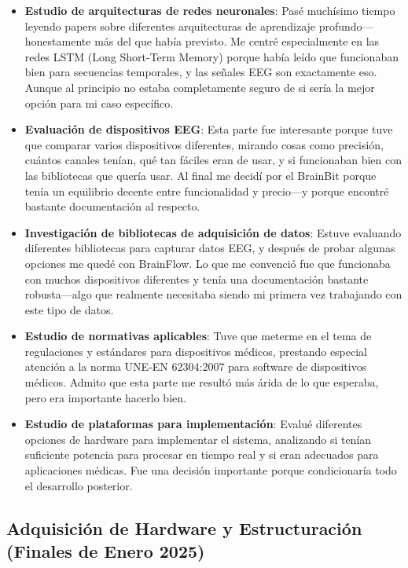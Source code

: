 \begin{itemize}
    \item \textbf{Estudio de arquitecturas de redes neuronales}: Pasé muchísimo tiempo leyendo papers sobre diferentes arquitecturas de aprendizaje profundo—honestamente más del que había previsto. Me centré especialmente en las redes LSTM (Long Short-Term Memory) porque había leído que funcionaban bien para secuencias temporales, y las señales EEG son exactamente eso. Aunque al principio no estaba completamente seguro de si sería la mejor opción para mi caso específico.
    
    \item \textbf{Evaluación de dispositivos EEG}: Esta parte fue interesante porque tuve que comparar varios dispositivos diferentes, mirando cosas como precisión, cuántos canales tenían, qué tan fáciles eran de usar, y si funcionaban bien con las bibliotecas que quería usar. Al final me decidí por el BrainBit porque tenía un equilibrio decente entre funcionalidad y precio—y porque encontré bastante documentación al respecto.
    
    \item \textbf{Investigación de bibliotecas de adquisición de datos}: Estuve evaluando diferentes bibliotecas para capturar datos EEG, y después de probar algunas opciones me quedé con BrainFlow. Lo que me convenció fue que funcionaba con muchos dispositivos diferentes y tenía una documentación bastante robusta—algo que realmente necesitaba siendo mi primera vez trabajando con este tipo de datos.
    
    \item \textbf{Estudio de normativas aplicables}: Tuve que meterme en el tema de regulaciones y estándares para dispositivos médicos, prestando especial atención a la norma UNE-EN 62304:2007 para software de dispositivos médicos. Admito que esta parte me resultó más árida de lo que esperaba, pero era importante hacerlo bien.
    
    \item \textbf{Estudio de plataformas para implementación}: Evalué diferentes opciones de hardware para implementar el sistema, analizando si tenían suficiente potencia para procesar en tiempo real y si eran adecuados para aplicaciones médicas. Fue una decisión importante porque condicionaría todo el desarrollo posterior.
\end{itemize}

\subsection{Adquisición de Hardware y Estructuración (Finales de Enero 2025)}

